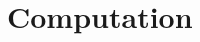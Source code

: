 \documentclass[preprint,12pt,authoryear]{elsarticle}
\theoremstyle{definition}
\begin{document}
\section{Computation}\label{computation}











\end{document}
